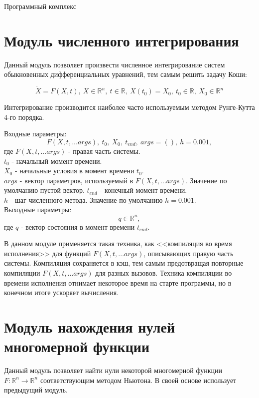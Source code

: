 \begin{chapter}{Программный комплекс}
\section{Модуль численного интегрирования}
Данный модуль позволяет произвести численное интегрирование систем обыкновенных
дифференциальных уравнений, тем самым решить задачу Коши:

$$
\dot{X} = F(X, t), \ X \in \mathbb{R}^n, \ t \in \mathbb{R}, \ X(t_0) = X_0, \ t_0 \in \mathbb{R}, \ X_0 \in \mathbb{R}^n
$$

Интегрирование производится наиболее часто используемым методом Рунге-Кутта 4-го порядка.

Входные параметры: $$F(X, t, ...args), \ t_0, \ X_0,  \ t_{end}, \ args = (), \ h=0.001,$$
где $F(X, t, ...args)$ - правая часть системы. \\
$t_0$ - начальный момент времени. \\
$X_0$ - начальные условия в момент времени $t_0$. \\
$args$ - вектор параметров, используемый в $F(X, t, ...args)$. Значение по умолчанию пустой вектор.
$t_{end}$ - конечный момент времени. \\
$h$ - шаг численного метода. Значение по умолчанию $h = 0.001$. \\
Выходные параметры: $$ q \in \mathbb{R}^n,$$
где $q$ - вектор состояния в момент времени $t_{end}$.

В данном модуле применяется такая техника, как <<компиляция во время исполнения>>
для функций $F(X, t, ...args)$, описывающих правую часть системы. Компиляция сохраняется в кэш, тем
самым предотвращая повторные компиляции $F(X, t, ...args)$ для разных вызовов.
Техника компиляции во времени исполнения отнимает некоторое время на старте программы, но в конечном итоге ускоряет вычисления.

\section{Модуль нахождения нулей многомерной функции}
Данный модуль позволяет найти нули некоторой многомерной функции $F: \mathbb{R}^n \rightarrow \mathbb{R}^n$ соответствующим методом Ньютона.
В своей основе использует предыдущий модуль.


\end{chapter}
